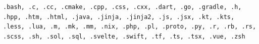 \begin{lstlisting}
.bash, .c, .cc, .cmake, .cpp, .css, .cxx, .dart, .go, .gradle, .h, .hpp, .htm, .html, .java, .jinja, .jinja2, .js, .jsx, .kt, .kts, .less, .lua, .m, .mk, .mm, .nix, .php, .pl, .proto, .py, .r, .rb, .rs, .scss, .sh, .sol, .sql, .svelte, .swift, .tf, .ts, .tsx, .vue, .zsh
\end{lstlisting}
